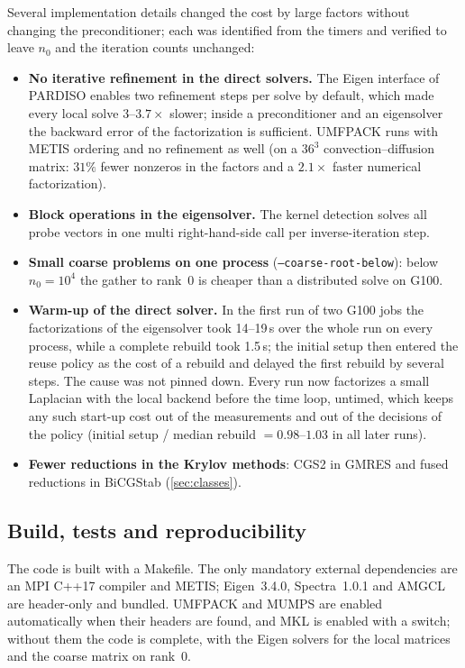 \documentclass[11pt,a4paper]{article}
\begin{document}
Several implementation details changed the cost by large factors without changing the preconditioner; each
was identified from the timers and verified to leave $n_0$ and the iteration counts unchanged:
\begin{itemize}
\item \textbf{No iterative refinement in the direct solvers.} The Eigen interface of PARDISO enables two
  refinement steps per solve by default, which made every local solve $3$--$3.7\times$ slower; inside a
  preconditioner and an eigensolver the backward error of the factorization is sufficient. UMFPACK runs with
  METIS ordering and no refinement as well (on a $36^3$ convection--diffusion matrix: $31\%$ fewer nonzeros in
  the factors and a $2.1\times$ faster numerical factorization).
\item \textbf{Block operations in the eigensolver.} The kernel detection solves all probe vectors in one
  multi right-hand-side call per inverse-iteration step.
\item \textbf{Small coarse problems on one process} (\texttt{--coarse-root-below}): below $n_0=10^4$ the
  gather to rank~0 is cheaper than a distributed solve on G100.
\item \textbf{Warm-up of the direct solver.} In the first run of two G100 jobs the factorizations of the
  eigensolver took 14--19\,s over the whole run on every process, while a complete rebuild took 1.5\,s; the
  initial setup then entered the reuse policy as the cost of a rebuild and delayed the first rebuild by several
  steps. The cause was not pinned down. Every run now factorizes a small Laplacian with the local backend
  before the time loop, untimed, which keeps any such start-up cost out of the measurements and out of the
  decisions of the policy (initial setup / median rebuild $=0.98$--$1.03$ in all later runs).
\item \textbf{Fewer reductions in the Krylov methods}: CGS2 in GMRES and fused reductions in BiCGStab
  (\cref{sec:classes}).
\end{itemize}

\subsection{Build, tests and reproducibility}\label{sec:build}

The code is built with a Makefile. The only mandatory external dependencies are an MPI C++17 compiler and
METIS; Eigen~3.4.0, Spectra~1.0.1 and AMGCL are header-only and bundled. UMFPACK and MUMPS are enabled
automatically when their headers are found, and MKL is enabled with a switch; without them the code is
complete, with the Eigen solvers for the local matrices and the coarse matrix on rank~0.
\end{document}
